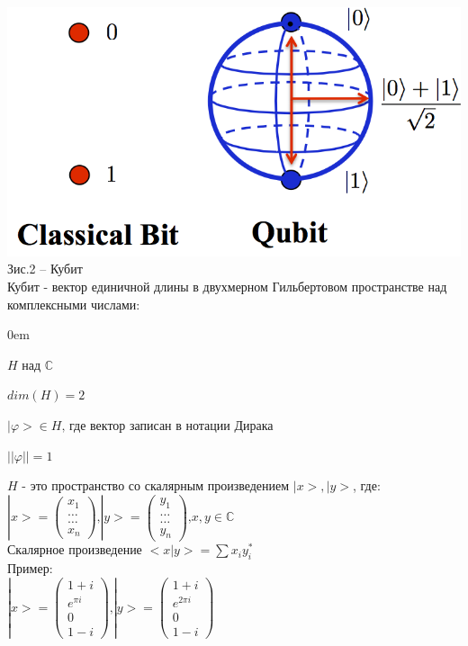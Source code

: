 \documentclass[11pt]{report}
\begin{document}
\includegraphics[scale=0.4]{qubit}\\
Зис.2 -- Кубит \\

Кубит - вектор единичной длины в двухмерном Гильбертовом пространстве над комплексными числами:\\

\begin{description}
\addtolength{\itemindent}{0.80cm}
\itemsep0em 
\item[] $H \text{ над } \mathbb{C}$
\item[] $dim(H) = 2$
\item[] $|\varphi> \in H \text{, где вектор записан в нотации Дирака} $
\item[]  $||\varphi|| = 1$
\end{description} 
$H$ - это пространство со скалярным произведением $|x>,|y>$, где:\\
$|x> = \begin{pmatrix}
x_1 \\
\dots \\
\dots \\
x_n
\end{pmatrix}
\text{,}
|y> = \begin{pmatrix}
y_1 \\
\dots \\
\dots \\
y_n
\end{pmatrix}
\text{,}
x,y \in \mathbb{C}
$\\

Скалярное произведение $<x|y> = \sum x_i y_i^\text{*}$ \\

Пример: \\
$|x> = \begin{pmatrix}
1+i \\
e^{\pi i} \\
0 \\
1-i
\end{pmatrix}
\text{,}
|y> = \begin{pmatrix}
1+i \\
e^{2\pi i} \\
0 \\
1-i
\end{pmatrix}$\\
\end{document}
